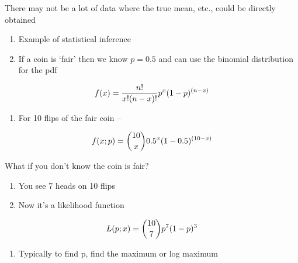 \documentclass[aspectratio=1610,pdftex,dvipsnames,compress,xcolor={dvipsnames}]{beamer}
\newcommand{\acs}{\acrshort} %
\begin{document}
\begin{frame}{There may not be a lot of data where the true mean, etc., could be directly obtained}
    \begin{enumerate}[series=outerlist,topsep=0pt,itemsep=15pt,leftmargin=*,label=(\arabic*)]
        \item[]Example of statistical inference
        \item[]If a coin is `fair' then we know $p = 0.5$ and can use the binomial distribution for the \acs{pdf}
    \end{enumerate}

    \vspace*{\fill}

    \begin{equation}
        \LARGE
        f(x) = \frac{n!}{x!(n-x)!}p^x(1-p)^{(n-x)}
    \end{equation}

    \vspace*{\fill}

    \begin{enumerate}[series=outerlist,topsep=0pt,itemsep=15pt,leftmargin=*,label=(\arabic*)]
        \item[]For 10 flips of the fair coin --
    \end{enumerate}

    \vspace*{\fill}

    \begin{equation}
        \LARGE
        f(x;p) = \binom{10}{x}0.5^x(1-0.5)^{(10-x)}
    \end{equation}
\end{frame}


\begin{frame}{What if you don't know the coin is fair?}
    \begin{enumerate}[series=outerlist,topsep=0pt,itemsep=21pt,leftmargin=*,label=(\arabic*)]
        \item[]You see 7 heads on 10 flips
        \item[]Now it's a likelihood function
    \end{enumerate}

    \vspace*{\fill}

    \begin{equation}
        \LARGE
        L(p;x) = \binom{10}{7}p^7(1-p)^3
    \end{equation}

    \vspace*{\fill}

    \begin{enumerate}[series=outerlist,topsep=0pt,itemsep=15pt,leftmargin=*,label=(\arabic*)]
        \item[]Typically to find p, find the maximum or log maximum
    \end{enumerate}
\end{frame}
\end{document}
